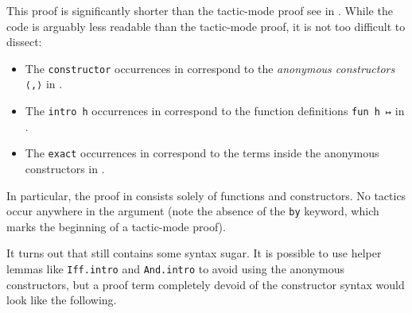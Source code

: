 
This proof is significantly shorter than the tactic-mode proof see in . While the code is arguably less readable than the tactic-mode proof, it is not too difficult to dissect:
\begin{itemize}
    \item The \lstinline|constructor| occurrences in  correspond to the \textit{anonymous constructors} \lstinline|⟨,⟩| in .

    \item The \lstinline|intro h| occurrences in  correspond to the function definitions \lstinline|fun h ↦| in .

    \item The \lstinline|exact| occurrences in  correspond to the terms inside the anonymous constructors in .
\end{itemize}

In particular, the proof in  consists solely of functions and constructors. No tactics occur anywhere in the argument (note the absence of the \lstinline|by| keyword, which marks the beginning of a tactic-mode proof).

It turns out that  still contains some syntax sugar. It is possible to use helper lemmas like \verb|Iff.intro| and \verb|And.intro| to avoid using the anonymous constructors, but a proof term completely devoid of the constructor syntax would look like the following.


